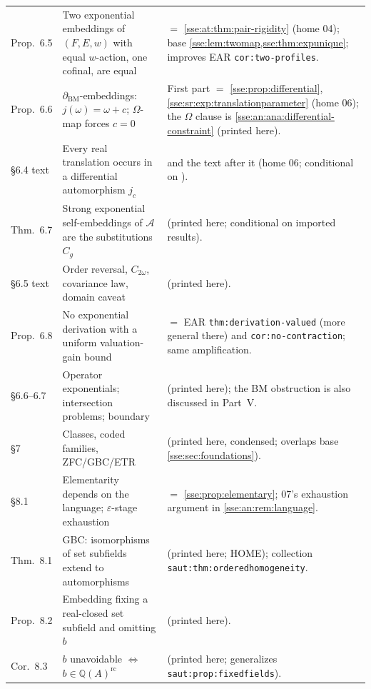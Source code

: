 \documentclass[11pt,a4paper]{article}
\numberwithin{equation}{section}
\theoremstyle{plain}
\theoremstyle{definition}
\theoremstyle{remark}
\newcommand{\Q}{\mathbb{Q}}
\newcommand{\lbl}[1]{\nolinkurl{#1}}%
\begin{document}
\begin{longtable}{P{17mm}P{60mm}P{73mm}}
Prop.~6.5 & Two exponential embeddings of $(F,E,w)$ with equal $w$-action, one cofinal, are equal & $=$ \cref{sse:at:thm:pair-rigidity} (home 04); base \cref{sse:lem:twomap,sse:thm:expunique}; improves EAR \lbl{cor:two-profiles}. \\
Prop.~6.6 & $\partial_{\mathrm{BM}}$-embeddings: $j(\omega)=\omega+c$; $\Omega$-map forces $c=0$ & First part $=$ \cref{sse:prop:differential}, \cref{sse:sr:exp:translationparameter} (home 06); the $\Omega$ clause is \cref{sse:an:ana:differential-constraint} (printed here). \\
\S6.4 text & Every real translation occurs in a differential automorphism $j_c$ &  and the text after it (home 06; conditional on \cite{sr-ADH,an-VdDEhrlichH}). \\
Thm.~6.7 & Strong exponential self-embeddings of $\mathcal A$ are the substitutions $C_g$ &  (printed here; conditional on imported results). \\
\S6.5 text & Order reversal, $C_{2\omega}$, covariance law, domain caveat &  (printed here). \\
Prop.~6.8 & No exponential derivation with a uniform valuation-gain bound & $=$ EAR \lbl{thm:derivation-valued} (more general there) and \lbl{cor:no-contraction}; same amplification. \\
\S6.6--6.7 & Operator exponentials; intersection problems; \cite[Thm.~8.4]{sr-BM19} boundary &  (printed here); the BM obstruction is also discussed in Part~V. \\
\S7 & Classes, coded families, ZFC/GBC/ETR &  (printed here, condensed; overlaps base \cref{sse:sec:foundations}). \\
\S8.1 & Elementarity depends on the language; $\varepsilon$-stage exhaustion & $=$ \cref{sse:prop:elementary}; 07's exhaustion argument in \cref{sse:an:rem:language}. \\
Thm.~8.1 & GBC: isomorphisms of set subfields extend to automorphisms &  (printed here; HOME); collection \lbl{saut:thm:orderedhomogeneity}. \\
Prop.~8.2 & Embedding fixing a real-closed set subfield and omitting $b$ &  (printed here). \\
Cor.~8.3 & $b$ unavoidable $\iff$ $b\in\Q(A)^{\mathrm{rc}}$ &  (printed here; generalizes \lbl{saut:prop:fixedfields}). \\

\end{longtable}
\end{document}
